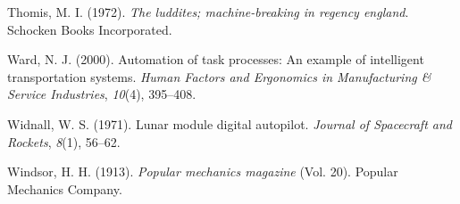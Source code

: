 \documentclass[
  man]{apa7}
\newlength{\cslhangindent}
\newlength{\cslentryspacingunit} %
\newenvironment{CSLReferences}[2] %
 {%
  \setlength{\parindent}{0pt}
  \ifodd #1
  \let\oldpar\par
  \def\par{\hangindent=\cslhangindent\oldpar}
  \fi
  \setlength{\parskip}{#2\cslentryspacingunit}
 }%
 {}
\begin{document}
\begin{CSLReferences}{1}{0}
\leavevmode{}%
Thomis, M. I. (1972). \emph{The luddites; machine-breaking in regency england}. Schocken Books Incorporated.

\leavevmode{}%
Ward, N. J. (2000). Automation of task processes: An example of intelligent transportation systems. \emph{Human Factors and Ergonomics in Manufacturing \& Service Industries}, \emph{10}(4), 395--408.

\leavevmode{}%
Widnall, W. S. (1971). Lunar module digital autopilot. \emph{Journal of Spacecraft and Rockets}, \emph{8}(1), 56--62.

\leavevmode{}%
Windsor, H. H. (1913). \emph{Popular mechanics magazine} (Vol. 20). Popular Mechanics Company.

\end{CSLReferences}

\endgroup
\end{document}
